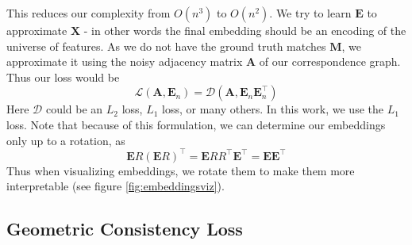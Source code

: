 \documentclass[10pt,twocolumn,letterpaper]{article}
\newcommand{\mat}[1]{\mathbf{#1}}
\begin{document}
This reduces our complexity from $O(n^3)$ to $O(n^2)$.
We try to learn $\mat{E}$ to approximate $\mat{X}$ - in other words the final embedding should be an encoding of the universe of features. As we do not have the ground truth matches $\mat{M}$, we approximate it using the noisy adjacency matrix $\mat{A}$ of our correspondence graph. Thus our loss would be 
\begin{equation}
\mathcal{L}(\mat{A}, \mat{E}_n) = \mathcal{D}(\mat{A}, \mat{E}_n\mat{E}_n^\top)
\end{equation}
Here $\mathcal{D}$ could be an $L_2$ loss, $L_1$ loss, or many others. In this work, we use the $L_1$ loss. 
Note that because of this formulation, we can determine our embeddings only up to a rotation, as
\begin{equation}
\mat{E}R(\mat{E}R)^\top
= \mat{E}RR^\top\mat{E}^\top
= \mat{E}\mat{E}^\top
\label{eq:rotinvar}
\end{equation}
Thus when visualizing embeddings, we rotate them to make them more interpretable (see figure \ref{fig:embeddingsviz}).

\subsection{Geometric Consistency Loss}
\end{document}
